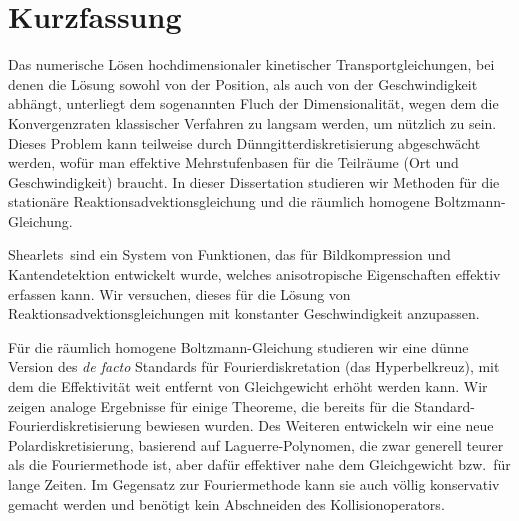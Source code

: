 \chapter*{Kurzfassung}

Das numerische L\"osen hochdimensionaler kinetischer Transportgleichungen, bei denen die L\"osung sowohl von
der Position, als auch von der Geschwindigkeit abh\"angt, unterliegt dem sogenannten \glqq Fluch der
Dimensionalit\"at\grqq, wegen dem die Konvergenzraten klassischer Verfahren zu langsam werden, um n\"utzlich zu
sein. Dieses Problem kann teilweise durch Dünn\-gitter\-diskretisierung ab\-geschw\"acht werden, wof\"ur man
effektive Mehrstufen\-basen f\"ur die Teilr\"aume (Ort und Geschwindigkeit) braucht. In dieser Dissertation
studieren wir Methoden f\"ur die station\"are Reaktions\-advektions\-gleichung und die r\"aumlich homogene
Boltzmann-Gleichung.

\glqq Shearlets\grqq \ sind ein System von Funktionen, das f\"ur Bildkompression und Kantendetektion
entwickelt wurde, welches anisotropische Eigenschaften effektiv erfassen kann. Wir versuchen, dieses f\"ur die
L\"osung von Reaktions\-advektions\-gleichungen mit konstanter Geschwindigkeit anzupassen.

F\"ur die r\"aumlich homogene Boltzmann-Gleichung studieren wir eine d\"unne Version des {\em de facto}
Standards f\"ur Fourierdiskretation (das Hyperbelkreuz), mit dem die Effektivit\"at weit entfernt von
Gleichgewicht erh\"oht werden kann. Wir zeigen analoge Ergebnisse f\"ur einige Theoreme, die bereits f\"ur die
Standard-Fourierdiskretisierung bewiesen wurden. Des Weiteren entwickeln wir eine neue Polar\-diskretisierung,
basierend auf Laguerre-Polynomen, die zwar generell teu\-rer als die Fouriermethode ist, aber daf\"ur
effektiver nahe dem Gleichgewicht bzw.\ f\"ur lange Zeiten. Im Gegensatz zur Fouriermethode kann sie auch
v\"ollig konservativ gemacht werden und ben\"otigt kein Abschneiden des Kollisionoperators.
